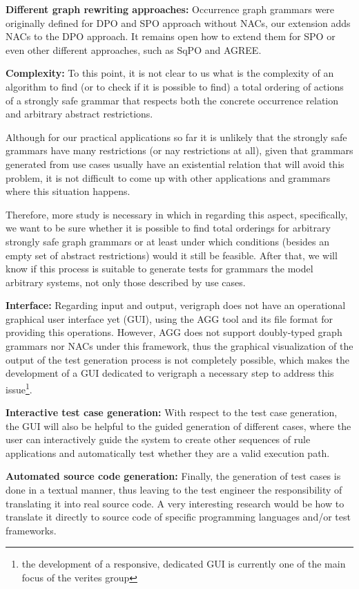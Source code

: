\textbf{Different graph rewriting approaches:} Occurrence graph grammars were originally defined for DPO and SPO approach without NACs, our extension adds NACs to the DPO approach. It remains open how to extend them for SPO or even other different approaches, such as SqPO and AGREE.

\textbf{Complexity:} To this point, it is not clear to us what is the complexity of an algorithm to find (or to check if it is possible to find) a total ordering of actions of a strongly safe grammar that respects both the concrete occurrence relation and arbitrary abstract restrictions.

  Although for our practical applications so far it is unlikely that the strongly safe grammars have many restrictions (or nay restrictions at all), given that grammars generated from use cases usually have an existential relation that will avoid this problem, it is not difficult to come up with other applications and grammars where this situation happens.

  Therefore, more study is necessary in which in regarding this aspect, specifically, we want to be sure whether it is possible to find total orderings for arbitrary strongly safe graph grammars or at least under which conditions (besides an empty set of abstract restrictions) would it still be feasible. After that, we will know if this process is suitable to generate tests for grammars the model arbitrary systems, not only those described by use cases.


\textbf{Interface:} Regarding input and output, verigraph does not have an operational graphical user interface yet (GUI), using the AGG tool and its  file format for providing this operations. However, AGG does not support doubly-typed graph grammars nor NACs under this framework, thus the graphical visualization of the output of the test generation process is not completely possible, which makes the development of a GUI dedicated to verigraph a necessary step to address this issue\footnote{the development
  of a responsive, dedicated GUI is currently one of the main focus of the verites group}.

\textbf{Interactive test case generation:} With respect to the test case generation, the GUI will also be helpful to the guided generation of different cases, where the user can interactively guide the system to create other sequences of rule applications and automatically test whether they are a valid execution path.


\textbf{Automated source code generation:}
  Finally, the generation of test cases is done in a textual manner, thus leaving to the test engineer  the responsibility of translating it into real source code. A very interesting research would be how to translate it directly to source code of specific programming languages and/or test frameworks.
